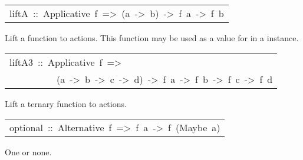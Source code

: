 \begin{haddockdesc}
\item[\begin{tabular}{@{}l}
liftA\ ::\ Applicative\ f\ =>\ (a\ ->\ b)\ ->\ f\ a\ ->\ f\ b
\end{tabular}]\haddockbegindoc
Lift a function to actions.
 This function may be used as a value for  in a  instance.\par

\end{haddockdesc}
\begin{haddockdesc}
\item[\begin{tabular}{@{}l}
liftA3\ ::\ Applicative\ f\ =>\\\ \ \ \ \ \ \ \ \ \ (a\ ->\ b\ ->\ c\ ->\ d)\ ->\ f\ a\ ->\ f\ b\ ->\ f\ c\ ->\ f\ d
\end{tabular}]\haddockbegindoc
Lift a ternary function to actions.\par

\end{haddockdesc}
\begin{haddockdesc}
\item[\begin{tabular}{@{}l}
optional\ ::\ Alternative\ f\ =>\ f\ a\ ->\ f\ (Maybe\ a)
\end{tabular}]\haddockbegindoc
One or none.\par

\end{haddockdesc}